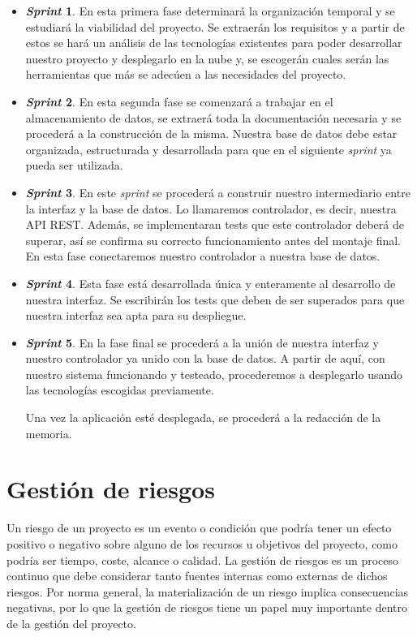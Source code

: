 \begin{itemize}
    \item \textbf{\textit{Sprint} 1}. En esta primera fase determinará la organización temporal y se estudiará la viabilidad del proyecto. Se extraerán los requisitos y a partir de estos se hará un análisis de las tecnologías existentes para poder desarrollar nuestro proyecto y desplegarlo en la nube y, se escogerán cuales serán las herramientas que más se adecúen a las necesidades del proyecto.
    
    \item \textbf{\textit{Sprint} 2}. En esta segunda fase se comenzará a trabajar en el almacenamiento de datos, se extraerá toda la documentación necesaria y se procederá a la construcción de la misma. Nuestra base de datos debe estar organizada, estructurada y desarrollada para que en el siguiente \textit{sprint} ya pueda ser utilizada.
    \item \textbf{\textit{Sprint} 3}. En este \textit{sprint} se procederá a construir nuestro intermediario entre la interfaz y la base de datos. Lo llamaremos controlador, es decir, nuestra API REST. Además, se implementaran tests que este controlador deberá de superar, así se confirma su correcto funcionamiento antes del montaje final. En esta fase conectaremos nuestro controlador a nuestra base de datos.
    \item \textbf{\textit{Sprint} 4}. Esta fase está desarrollada única y enteramente al desarrollo de nuestra interfaz. Se escribirán los tests que deben de ser superados para que nuestra interfaz sea apta para su despliegue.
    \item \textbf{\textit{Sprint} 5}. En la fase final se procederá a la unión de nuestra interfaz y nuestro controlador ya unido con la base de datos. A partir de aquí, con nuestro sistema funcionando y testeado, procederemos a desplegarlo usando las tecnologías escogidas previamente. 
    
    Una vez la aplicación esté desplegada, se procederá a la redacción de la memoria.
\end{itemize}

\section{Gestión de riesgos}
Un riesgo de un proyecto es un evento o condición  que podría tener un efecto positivo o negativo sobre alguno de los recursos u objetivos del proyecto, como podría ser tiempo, coste, alcance o calidad. La gestión de riesgos es un proceso continuo que debe considerar tanto fuentes internas como externas de dichos riesgos. Por norma general, la materialización de un riesgo implica consecuencias negativas, por lo que la gestión de riesgos tiene un papel muy importante dentro de la gestión del proyecto. 

